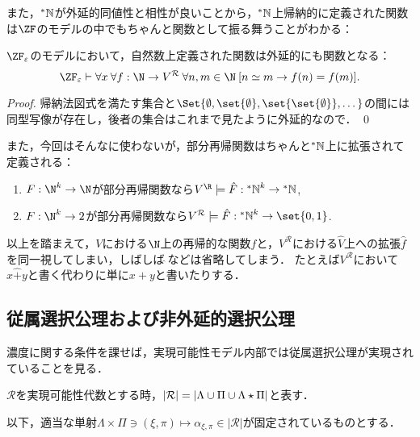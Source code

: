 \documentclass[realisability.tex]{subfiles}
\begin{document}
また，$\mathord{{}^{*}\mathbb{N}}$が外延的同値性と相性が良いことから，$\mathord{{}^{*}\mathbb{N}}$上帰納的に定義された関数は$\ZF$のモデルの中でもちゃんと関数として振る舞うことがわかる：

\begin{lemma}\label{lem:nat-func-strong}
 $\ZF_{\varepsilon}$のモデルにおいて，自然数上定義された関数は外延的にも関数となる：
 \[
 \ZFe \vdash \forall x \: \forall f : \N \to V^{\mathcal{R}}\:
 \forall n, m \in \N \: [n \simeq m \to f(n) = f(m)].
 \]
\end{lemma}
\begin{proof}
 帰納法図式を満たす集合と$\Set{ \emptyset, \set{\emptyset}, \set{\set{\emptyset}}, \dots}$の間には同型写像が存在し，後者の集合はこれまで見たように外延的なので． \qed
\end{proof}

また，今回はそんなに使わないが，部分再帰関数はちゃんと$\mathord{{}^{*}\mathbb{N}}$上に拡張されて定義される：
\begin{lemma}\label{lem:recursives-defined}
 \begin{enumerate}
  \item $F: \N^k \to \N$が部分再帰関数なら$V^{\R} \models \hat{F}: \NN^k \to \NN$,
  \item $F: \N^k \to 2$が部分再帰関数なら$V^{\mathcal{R}} \models \hat{F}: \NN^k \to \set{0, 1}$.
 \end{enumerate}
\end{lemma}

以上を踏まえて，$V$における$\N$上の再帰的な関数$f$と，$V^{\mathcal{R}}$における$\hat{V}$上への拡張$\hat{f}$を同一視してしまい，しばしば$\hat{\;}$などは省略してしまう．
たとえば$V^{\mathcal{R}}$において$x \mathbin{\hat{+}} y$と書く代わりに単に$x + y$と書いたりする．

\subsection{従属選択公理および非外延的選択公理}
濃度に関する条件を課せば，実現可能性モデル内部では従属選択公理が実現されていることを見る．
\begin{definition}
 $\mathcal{R}$を実現可能性代数とする時，$|\mathcal{R}| = \left\lvert\Lambda \cup \Pi \cup \Lambda \mathbin{\star} \Pi\right\rvert$と表す．

 以下，適当な単射$\Lambda \times \Pi \ni (\xi, \pi) \mapsto \alpha_{\xi,\pi} \in |\mathcal{R}|$が固定されているものとする．
\end{definition}
\end{document}
